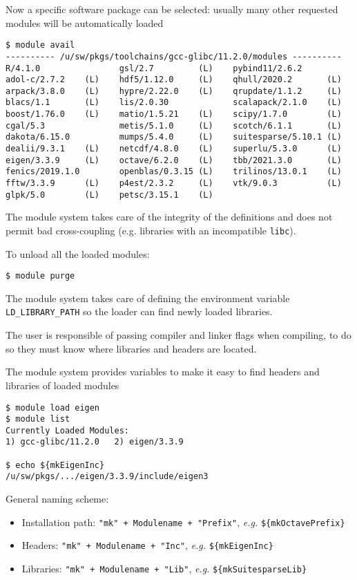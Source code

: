 \documentclass[10pt,aspectratio=169]{beamer}
\begin{document}
\begin{frame}[fragile]
  \small
  Now a specific software package can be selected: usually many other requested modules will be automatically loaded
\begin{verbatim}
$ module avail
---------- /u/sw/pkgs/toolchains/gcc-glibc/11.2.0/modules ----------
R/4.1.0                gsl/2.7         (L)    pybind11/2.6.2
adol-c/2.7.2    (L)    hdf5/1.12.0     (L)    qhull/2020.2       (L)
arpack/3.8.0    (L)    hypre/2.22.0    (L)    qrupdate/1.1.2     (L)
blacs/1.1       (L)    lis/2.0.30             scalapack/2.1.0    (L)
boost/1.76.0    (L)    matio/1.5.21    (L)    scipy/1.7.0        (L)
cgal/5.3               metis/5.1.0     (L)    scotch/6.1.1       (L)
dakota/6.15.0          mumps/5.4.0     (L)    suitesparse/5.10.1 (L)
dealii/9.3.1    (L)    netcdf/4.8.0    (L)    superlu/5.3.0      (L)
eigen/3.3.9     (L)    octave/6.2.0    (L)    tbb/2021.3.0       (L)
fenics/2019.1.0        openblas/0.3.15 (L)    trilinos/13.0.1    (L)
fftw/3.3.9      (L)    p4est/2.3.2     (L)    vtk/9.0.3          (L)
glpk/5.0        (L)    petsc/3.15.1    (L)
\end{verbatim}

The module system takes care of the integrity of the definitions and does not permit bad cross-coupling (e.g. libraries with an incompatible \texttt{libc}).\smallskip

To unload all the loaded modules:
\begin{verbatim}
$ module purge
\end{verbatim}
\end{frame}


\begin{frame}[fragile]

  The module system takes care of defining the environment variable \texttt{LD\_LIBRARY\_PATH} so the loader can find newly loaded libraries.

  The user is responsible of passing compiler and linker flags when compiling, to do so they must know where libraries and headers are located.

  The module system provides variables to make it easy to find headers and libraries of loaded modules

\begin{verbatim}
$ module load eigen
$ module list
Currently Loaded Modules:
1) gcc-glibc/11.2.0   2) eigen/3.3.9

$ echo ${mkEigenInc}
/u/sw/pkgs/.../eigen/3.3.9/include/eigen3
\end{verbatim}

General naming scheme: 
\begin{itemize}
\item Installation path: \texttt{"mk" + Modulename + "Prefix"}, \textit{e.g.} \texttt{\$\{mkOctavePrefix\}}
\item Headers: \texttt{"mk" + Modulename + "Inc"}, \textit{e.g.} \texttt{\$\{mkEigenInc\}}
\item Libraries: \texttt{"mk" + Modulename + "Lib"}, \textit{e.g.} \texttt{\$\{mkSuitesparseLib\}}
\end{itemize}
\end{frame}
\end{document}
